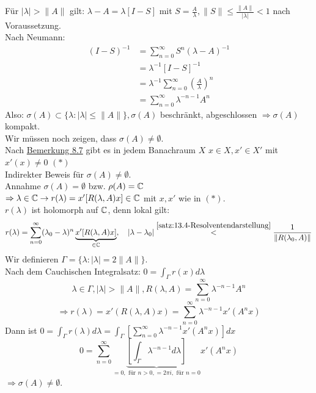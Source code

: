 \begin{beweis}
	Für $| \lambda | > \| A \|$ gilt: $\lambda - A = \lambda [I - S]$ mit $S = \frac{A}{\lambda}, \| S \| \leq \frac{\| A \|}{| \lambda |} < 1$ nach Voraussetzung. \\
	Nach Neumann: 
	\begin{align*}
		(I - S)^{-1} & = \sum_{n = 0}^{\infty} S^{n} (\lambda - A)^{-1} \\
			& = \lambda^{-1} [I - S]^{-1} \\
			& = \lambda^{-1} \sum_{n = 0}^{\infty} \left( \frac{A}{\lambda} \right)^{n} \\
			& = \sum_{n = 0}^{\infty} \lambda^{-n-1} A^{n}
	\end{align*}
	Also: $\sigma(A) \subset \{ \lambda: |\lambda| \leq \|A\| \}, \sigma(A)$ beschränkt, abgeschlossen $\Rightarrow \sigma(A)$ kompakt. \\
	Wir müssen noch zeigen, dass $\sigma(A) \neq \emptyset$. \\
	Nach \hyperref[bem:8.7]{Bemerkung 8.7} gibt es in jedem Banachraum $X$ $x \in X, x' \in X'$ mit $x'(x) \neq 0$ $(*)$ \label{eq:13.6.5-DualAbbildungAuf0} \\
	Indirekter Beweis für $\sigma(A) \neq \emptyset$. \\
	Annahme $\sigma(A) = \emptyset$ bzw. $\rho(A) = \mathbb{C}$ \\
	$\Rightarrow \lambda \in \mathbb{C} \rightarrow r(\lambda) = x'[R(\lambda, A)x] \in \mathbb{C}$ mit $x, x'$ wie in \hyperref[eq:13.6.5-DualAbbildungAuf0]{$(*)$}. \\
	$r(\lambda)$ ist holomorph auf $\mathbb{C}$, denn lokal gilt:
		\[ r(\lambda) = \sum_{n = 0}^{\infty} (\lambda_{0} - \lambda)^{n} \underbrace{x'[R(\lambda, A) x]}_{\in \mathbb{C}}, \quad |\lambda - \lambda_{0}| \overset{\ref{satz:13.4-Resolventendarstellung}}{<} \frac{1}{\| R(\lambda_{0}, A)\|} \]
	Wir definieren $\Gamma = \{ \lambda: |\lambda| = 2 \| A \| \}$. \\
	Nach dem Cauchischen Integralsatz: $0 = \int_{\Gamma} r(x) d\lambda$
	\[ \lambda \in \Gamma, |\lambda| > \| A \|, R(\lambda, A) = \sum_{n = 0}^{\infty} \lambda^{-n-1} A^{n} \]
	\[ \Rightarrow r(\lambda) = x'(R(\lambda, A)x) = \sum_{n = 0}^{\infty} \lambda^{-n-1} x'(A^{n}x) \]
	Dann ist $0 = \int_{\Gamma} r(\lambda) d\lambda = \int_{\Gamma} \left[ \sum_{n = 0}^{\infty} \lambda^{-n-1} x'(A^{n}x) \right] dx$
	\[ 0 = \sum_{n = 0}^{\infty} \underbrace{\left[ \int_{\Gamma} \lambda^{-n-1} d\lambda \right]}_{= 0, \text{ für } n > 0, = 2 \pi i,  \text{ für } n = 0} x'(A^{n} x) \]
	$\Rightarrow \sigma(A) \neq \emptyset$.
\end{beweis}


